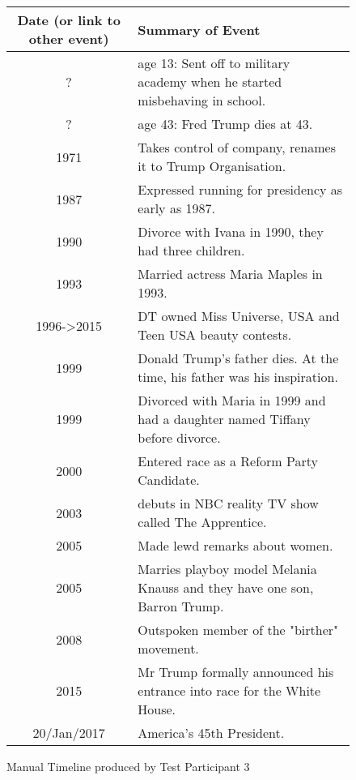\begin{figure}[H]
\begin{tabular}{|c|p{8.5cm}|}
\hline
Date (or link to other event) & Summary of Event\\
\hline
\hline
? & age 13: Sent off to military academy when he started misbehaving in school.\\
\hline
? & age 43: Fred Trump dies at 43.\\
\hline
1971 & Takes control of company, renames it to Trump Organisation.\\
\hline
1987 & Expressed running for presidency as early as 1987.\\
\hline
1990 & Divorce with Ivana in 1990, they had three children.\\
\hline
1993 & Married actress Maria Maples in 1993.\\
\hline
1996->2015 & DT owned Miss Universe, USA and Teen USA beauty contests.\\
\hline
1999 & Donald Trump's father dies. At the time, his father was his inspiration.\\
\hline
1999 & Divorced with Maria in 1999 and had a daughter named Tiffany before divorce.\\
\hline
2000 & Entered race as a Reform Party Candidate.\\
\hline
2003 & debuts in NBC reality TV show called The Apprentice.\\
\hline
2005 & Made lewd remarks about women.\\
\hline
2005 & Marries playboy model Melania Knauss and they have one son, Barron Trump.\\
\hline
2008 & Outspoken member of the "birther" movement.\\
\hline
2015 & Mr Trump formally announced his entrance into race for the White House.\\
\hline
20/Jan/2017 & America's 45th President.\\
\hline
\end{tabular}
\caption{Manual Timeline produced by Test Participant 3}
\end{figure}

